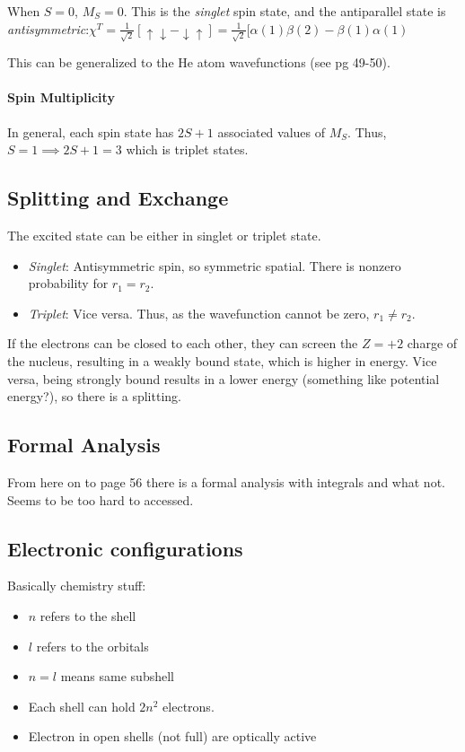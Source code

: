 \documentclass[12pt]{article}
\begin{document}
When $S = 0$, $M_S = 0$. This is the \textit{singlet} spin state, and the antiparallel state is \textit{antisymmetric}:$\chi^T = \frac{1}{\sqrt{2}}[\uparrow\downarrow - \downarrow\uparrow] = \frac{1}{\sqrt{2}}[\alpha(1)\beta(2)-\beta(1)\alpha(1)$

This can be generalized to the He atom wavefunctions (see pg 49-50).

\paragraph{Spin Multiplicity}

In general, each spin state has $2S+1$ associated values of $M_S$. Thus, $S=1 \implies 2S+1 = 3$ which is triplet states.

\subsection{Splitting and Exchange}

The excited state can be either in singlet or triplet state. 
\begin{itemize}
    \item \textit{Singlet}: Antisymmetric spin, so symmetric spatial. There is nonzero probability for $r_1=r_2$.
    \item \textit{Triplet}: Vice versa. Thus, as the wavefunction cannot be zero, $r_1\neq r_2$.
\end{itemize}

If the electrons can be closed to each other, they can screen the $Z=+2$ charge of the nucleus, resulting in a weakly bound state, which is higher in energy. Vice versa, being strongly bound results in a lower energy (something like potential energy?), so there is a splitting.

\subsection{Formal Analysis}
From here on to page 56 there is a formal analysis with integrals and what not. Seems to be too hard to accessed.

\subsection{Electronic configurations}

Basically chemistry stuff:

\begin{itemize}
    \item $n$ refers to the shell
    \item $l$ refers to the orbitals
    \item $n=l$ means same subshell
    \item Each shell can hold $2n^2$ electrons.
    \item Electron in open shells (not full) are optically active
\end{itemize}
    
\end{document}
